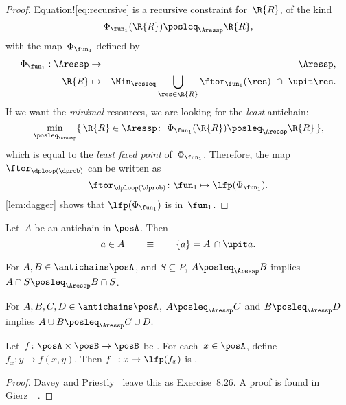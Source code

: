 \begin{proof}
    Equation!\cref{eq:recursive} is a recursive constraint for~$\R{R}$,
    of the kind
    \[
        \Phi_{\fun_{1}}(\R{R})\posleq_{\Aressp}\R{R},
    \]
    with the map~$\Phi_{\fun_{1}}$ defined by
    \begin{eqnarray}
        \Phi_{\fun_{1}}:\Aressp & \rightarrow & \Aressp,\label{eq:bigphi}\\
        \R{R} & \mapsto & \Min_{\resleq}\bigcup_{\res\in\R{R}}\ftor_{\fun_{1}}(\res)\ \cap\ \upit\res.\nonumber
    \end{eqnarray}
    If we want the \emph{minimal} resources, we are looking for the \emph{least}
    antichain:
    \[
        \min_{\posleq_{\Aressp}}\{\,\R{R}\in\Aressp\colon\ \Phi_{\fun_{1}}(\R{R})\posleq_{\Aressp}\R{R}\,\},
    \]
    which is equal to the \emph{least fixed point }of~$\Phi_{\fun_{1}}$.
    Therefore, the map $\ftor_{\dploop(\dprob)}$ can be written as
    \begin{equation}
        \ftor_{\dploop(\dprob)}\colon\fun_{1}\mapsto\lfp(\Phi_{\fun_{1}}).\label{eq:loop_fixpoint}
    \end{equation}
    \cref{lem:dagger} shows that $\lfp(\Phi_{\fun_{1}})$ is \scottcontinuous
    in~$\fun_{1}$.
\end{proof}

\begin{lemma}
    \label{lem:antichain-write}Let~$A$ be an antichain in $\posA$.
    Then
    \[
        a\in A\qquad\equiv\qquad\{a\}=A\,\cap\upit a.
    \]
\end{lemma}

\begin{lemma}
    \label{lem:antichain_inter}For $A,B\in\antichains\posA$, and $S\subseteq P$,
    $A\posleq_{\Aressp}B$ implies $A\cap S\posleq_{\Aressp}B\cap S$.
\end{lemma}

\begin{lemma}
    \label{lem:antichain_union}For $A,B,C,D\in\antichains\posA$, $A\posleq_{\Aressp}C$
    and $B\posleq_{\Aressp}D$ implies $A\cup B\posleq_{\Aressp}C\cup D.$
\end{lemma}

\begin{lemma}
    \label{lem:dagger}Let~$f\colon\posA\times\posB\rightarrow\posB$
    be \scottcontinuous. For each~$x\in\posA$, define $f_{x}:y\mapsto f(x,y).$
    Then $f^{\dagger}:x\mapsto\lfp(f_{x})$ is \scottcontinuous.
\end{lemma}
\begin{proof}
    Davey and Priestly~\cite{davey02} leave this as Exercise~8.26.
    A proof is found in Gierz~\etal~\cite[Exercise II-2.29]{gierz03continuous}.
\end{proof}

